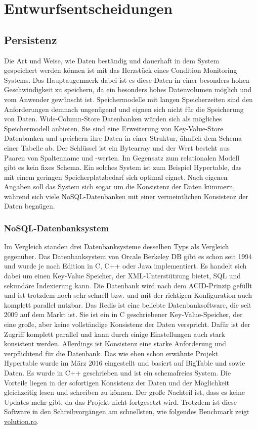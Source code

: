 \chapter{Entwurfsentscheidungen}
\section{Persistenz}
Die Art und Weise, wie Daten beständig und dauerhaft in dem System gespeichert werden können ist mit das Herzstück eines Condition Monitoring Systems. Das Hauptaugenmerk dabei ist es diese Daten in einer besonders hohen Geschwindigkeit zu speichern, da ein besonders hohes Datenvolumen möglich und vom Anwender gewünscht ist. Speichermodelle mit langen Speicherzeiten sind den Anforderungen demnach ungenügend und eignen sich nicht für die Speicherung von Daten. Wide-Column-Store Datenbanken würden sich als mögliches Speichermodell anbieten. Sie sind eine Erweiterung von Key-Value-Store Datenbanken und speichern ihre Daten in einer Struktur, ähnlich dem Schema einer Tabelle ab. Der Schlüssel ist ein Bytearray und der Wert besteht aus Paaren von Spaltenname und -werten. Im Gegensatz zum relationalen Modell gibt es kein fixes Schema. Ein solches System ist zum Beispiel Hypertable, das mit einem geringen Speicherplatzbedarf sich optimal eignet. Nach eigenen Angaben soll das System sich sogar um die Konsistenz der Daten kümmern, während sich viele NoSQL-Datenbanken mit einer vermeintlichen Konsistenz der Daten begnügen.
\subsection{NoSQL-Datenbanksystem}
Im Vergleich standen drei Datenbanksysteme desselben Typs als Vergleich gegenüber. Das Datenbanksystem von Orcale Berkeley DB gibt es schon seit 1994 und wurde je nach Edition in C, C++ oder Java implementiert. Es handelt sich dabei um einen Key-Value Speicher, der XML-Unterstützung bietet, SQL und sekundäre Indexierung kann. Die Datenbank wird nach dem ACID-Prinzip gefüllt und ist trotzdem noch sehr schnell bzw. und mit der richtigen Konfiguration auch komplett parallel nutzbar.
Das Redis ist eine beliebte Datenbanksoftware, die seit 2009 auf dem Markt ist. Sie ist ein in C geschriebener Key-Value-Speicher, der eine große, aber keine vollständige Konsistenz der Daten verspricht. Dafür ist der Zugriff komplett parallel und kann durch einige Einstellungen auch stark konsistent werden. Allerdings ist Konsistenz eine starke Anforderung und verpflichtend für die Datenbank. Das wie eben schon erwähnte Projekt Hypertable wurde im März 2016 eingestellt und basiert auf BigTable und sowie Daten. Es wurde in C++ geschrieben und ist ein schemafreies System. Die Vorteile liegen in der sofortigen Konsistenz der Daten und der Möglichkeit gleichzeitig lesen und schreiben zu können. Der große Nachteil ist, dass es keine Updates mehr gibt, da das Projekt nicht fortgesetzt wird. Trotzdem ist diese Software in den Schreibvorgängen am schnellsten, wie folgendes Benchmark zeigt \href{https://wiki.volution.ro/Dehems/Benchmarks/Results}{volution.ro}.
